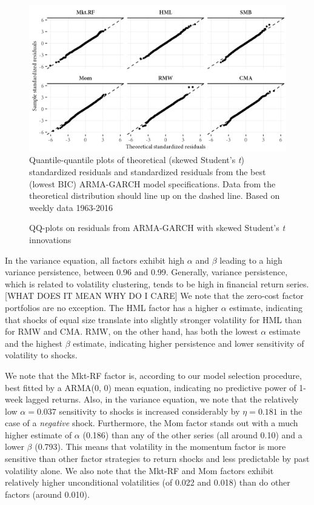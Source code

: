 \begin{figure}[htbp]
  \caption{QQ-plots on residuals from ARMA-GARCH with skewed Student's \textit{t} innovations}
  \label{fig:qq_ghst}
  \centering
  \begin{minipage}{\textwidth}
  \includegraphics[scale=1]{graphics/qq_ghst.png}  
  \vspace{3mm}      
  \footnotesize
  Quantile-quantile plots of theoretical (skewed Student's \textit{t}) standardized residuals and standardized residuals from the best (lowest BIC) ARMA-GARCH model specifications. Data from the theoretical distribution should line up on the dashed line. Based on weekly data 1963-2016
  \end{minipage}
\end{figure}

In the variance equation, all factors exhibit high $\alpha$ and $\beta$ leading to a high variance persistence, between 0.96 and 0.99. Generally, variance persistence, which is related to volatility clustering, tends to be high in financial return series. [WHAT DOES IT MEAN WHY DO I CARE] We note that the zero-cost factor portfolios are no exception. The HML factor has a higher $\alpha$ estimate, indicating that shocks of equal size translate into slightly stronger volatility for HML than for RMW and CMA. RMW, on the other hand, has both the lowest $\alpha$ estimate and the highest $\beta$ estimate, indicating higher persistence and lower sensitivity of volatility to shocks.

We note that the Mkt-RF factor is, according to our model selection procedure, best fitted by a ARMA(0, 0) mean equation, indicating no predictive power of 1-week lagged returns. Also, in the variance equation, we note that the relatively low $\alpha = 0.037$ sensitivity to shocks is increased considerably by $\eta = 0.181$ in the case of a \emph{negative} shock. Furthermore, the Mom factor stands out with a much higher estimate of $\alpha$ (0.186) than any of the other series (all around 0.10) and a lower $\beta$ (0.793). This means that volatility in the momentum factor is more sensitive than other factor strategies to return shocks and less predictable by past volatility alone. We also note that the Mkt-RF and Mom factors exhibit relatively higher unconditional volatilities (of 0.022 and 0.018) than do other factors (around 0.010).

